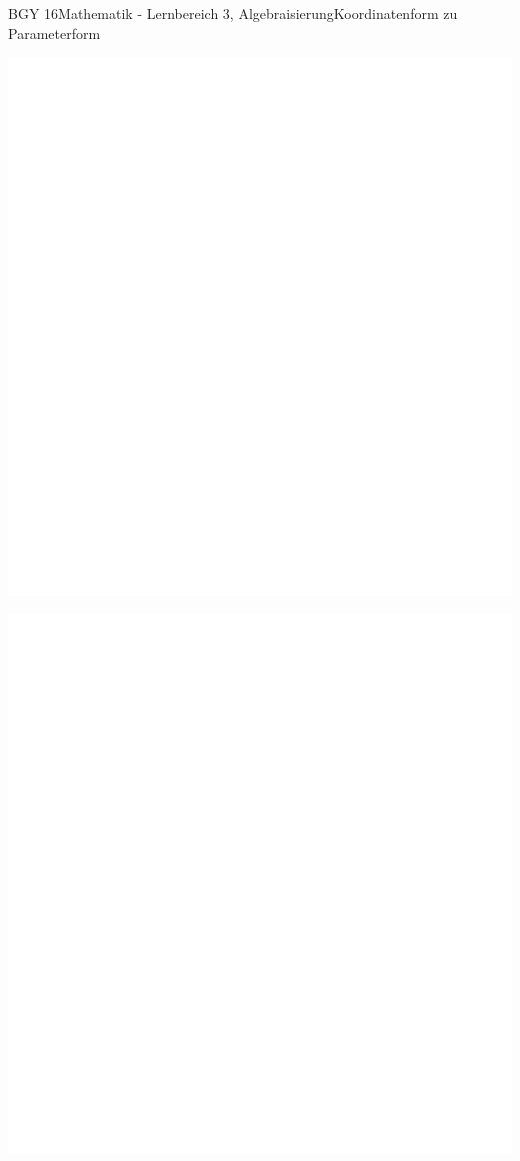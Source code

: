 \documentclass[oneside,openany,headings=optiontotoc,11pt,numbers=noenddot]{scrreprt}
\begin{document}
\begin{worksheet}{BGY 16}{Mathematik - Lernbereich 3, Algebraisierung}{Koordinatenform zu Parameterform}
\begin{framed}
		\end{framed}
		\begin{framed}
			\includegraphics[scale=0.9]{../empty.jpg}
		\end{framed}
		\begin{framed}
			\includegraphics[scale=1.1]{../empty.jpg}

\end{framed}
\end{worksheet}
\end{document}
